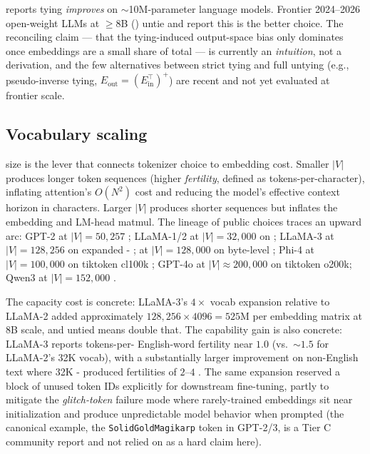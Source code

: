 \begin{contradiction}
\citet[\S 4--5]{press2017-tied-embed} reports tying \emph{improves}
 on $\sim$10M-parameter  language models. Frontier
2024--2026 open-weight LLMs at $\geq 8$B 
(\citealp{meta-llama3, olmo2, deepseek-v3, qwen3}) untie and report
this is the better choice. The reconciling claim — that the
tying-induced output-space bias only dominates once embeddings are a
small share of total  — is currently an
\emph{intuition}, not a derivation, and the few alternatives between
strict tying and full untying (e.g., pseudo-inverse tying,
$E_{\text{out}} = (E_{\text{in}}^\top)^+$) are recent and not yet
evaluated at frontier scale. 
\end{contradiction}

\subsection{Vocabulary scaling}
\label{sec:tok-vocab}

 size is the lever that connects tokenizer choice to
embedding cost. Smaller $|V|$ produces longer token sequences (higher
\emph{fertility}, defined as tokens-per-character), inflating
attention's $O(N^2)$ cost and reducing the model's effective context
horizon in characters. Larger $|V|$ produces shorter sequences but
inflates the embedding and LM-head matmul. The lineage of public
choices traces an upward arc: GPT-2 at $|V|=50{,}257$
\citep[\S 2.3]{radford2019-gpt2}; LLaMA-1/2 at $|V|=32{,}000$ on
  \citep[\S 2.3]{touvron2023}; LLaMA-3 at
$|V|=128{,}256$ on expanded -
\citep[\S 3.1]{meta-llama3};  at $|V|=128{,}000$ on
byte-level  \citep[\S 2.1]{deepseek-v3}; Phi-4 at $|V|=100{,}000$
on tiktoken cl100k \citep[\S 2.1]{phi4}; GPT-4o at $|V|\!\approx\!200{,}000$
on tiktoken o200k; Qwen3 at $|V|=152{,}000$ \citep{qwen3}.

The capacity cost is concrete: LLaMA-3's $4\times$ vocab expansion
relative to LLaMA-2 added approximately $128{,}256 \times 4096 = 525\text{M}$
 per embedding matrix at 8B scale, and untied means double
that. The capability gain is also concrete: LLaMA-3 reports tokens-per-
English-word fertility near $1.0$ (vs.\ $\sim 1.5$ for LLaMA-2's 32K
vocab), with a substantially larger improvement on non-English text
where 32K - produced fertilities of $2$--$4$
\citep[\S 3.1]{meta-llama3}. The same expansion reserved a block of
unused token IDs explicitly for downstream fine-tuning, partly to
mitigate the \emph{glitch-token} failure mode where rarely-trained
embeddings sit near initialization and produce unpredictable model
behavior when prompted (the canonical example, the
\texttt{SolidGoldMagikarp} token in GPT-2/3, is a Tier C community
report and not relied on as a hard claim here).

